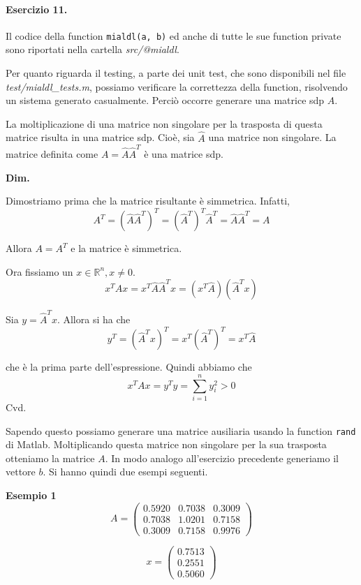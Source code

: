 \paragraph{Esercizio 11.} Il codice della function \verb|mialdl(a, b)| ed anche di tutte le sue function private sono riportati nella cartella \emph{src/@mialdl}.

Per quanto riguarda il testing, a parte dei unit test, che sono disponibili nel file \emph{test/mialdl\_tests.m}, possiamo verificare la correttezza della function, risolvendo un sistema generato casualmente. Perciò occorre generare una matrice sdp $A$.

La moltiplicazione di una matrice non singolare per la trasposta di questa matrice risulta in una matrice sdp. Cioè, sia $\hat{A}$ una matrice non singolare. La matrice definita come $A = \hat{A} \hat{A}^T$ è una matrice sdp.

\textbf{Dim.}

Dimostriamo prima che la matrice risultante è simmetrica. Infatti,
\[
A^T = (\hat{A}\hat{A}^T)^T = (\hat{A}^T)^T\hat{A}^T = \hat{A}\hat{A}^T = A
\]

Allora $A = A^T$ e la matrice è simmetrica.

Ora fissiamo un $x \in \mathbb{R}^n, x \neq 0$.
\[
x^T A x = x^T \hat{A} \hat{A}^T x = (x^T \hat{A}) (\hat{A}^T x)
\]

Sia $y = \hat{A}^T x$. Allora si ha che
\[
y^T = (\hat{A}^Tx)^T = x^T(\hat{A}^T)^T = x^T\hat{A}
\]

che è la prima parte dell'espressione. Quindi abbiamo che
\[
x^TAx = y^T y = \sum_{i=1}^{n} y_{i}^2 > 0
\]
Cvd.

Sapendo questo possiamo generare una matrice ausiliaria usando la function \verb|rand| di Matlab. Moltiplicando questa matrice non singolare per la sua trasposta otteniamo la matrice $A$. In modo analogo all'esercizio precedente generiamo il vettore $b$. Si hanno quindi due esempi seguenti.

\textbf{Esempio 1}
\[
A = \begin{pmatrix}
0.5920 & 0.7038 & 0.3009\\
0.7038 & 1.0201 & 0.7158\\
0.3009 & 0.7158 & 0.9976
\end{pmatrix}
\]

\[
x = \begin{pmatrix}
0.7513\\
0.2551\\
0.5060
\end{pmatrix}
\]

